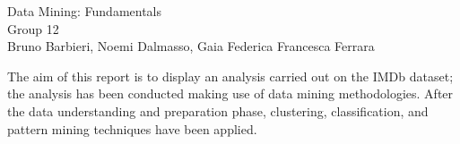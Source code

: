 \documentclass[11pt,openany]{report}
\begin{document}

\begin{center} %
     {\LARGE { Data Mining: Fundamentals}}\\
     \vspace{2cm}
    {\Large { Group 12 }}\\
     \vspace{2cm}
     {\large { Bruno Barbieri, Noemi Dalmasso, Gaia Federica Francesca Ferrara }}
\end{center}

The aim of this report is to display an analysis carried out on the IMDb dataset; the analysis has been conducted making use of data mining methodologies. 
After the data understanding and preparation phase, clustering, classification, and pattern mining techniques have been applied.


  



\tableofcontents

%
\end{document}
